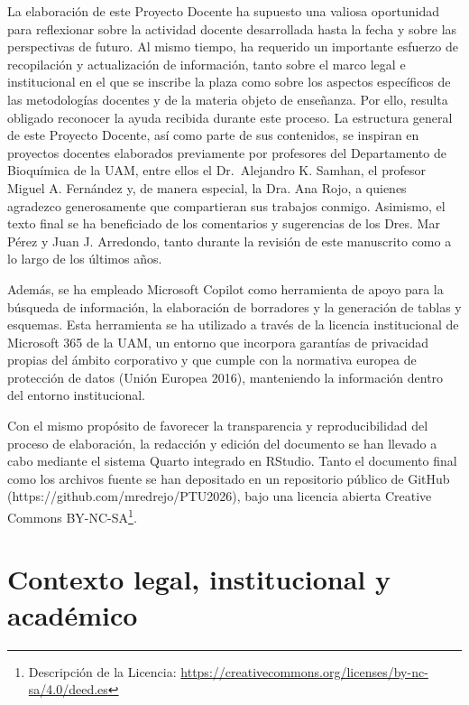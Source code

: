 \documentclass[
  11pt,
  a4paper,
  twoside]{scrreprt}
\begin{document}
La elaboración de este Proyecto Docente ha supuesto una valiosa
oportunidad para reflexionar sobre la actividad docente desarrollada
hasta la fecha y sobre las perspectivas de futuro. Al mismo tiempo, ha
requerido un importante esfuerzo de recopilación y actualización de
información, tanto sobre el marco legal e institucional en el que se
inscribe la plaza como sobre los aspectos específicos de las
metodologías docentes y de la materia objeto de enseñanza. Por ello,
resulta obligado reconocer la ayuda recibida durante este proceso. La
estructura general de este Proyecto Docente, así como parte de sus
contenidos, se inspiran en proyectos docentes elaborados previamente por
profesores del Departamento de Bioquímica de la UAM, entre ellos el
Dr.~Alejandro K. Samhan, el profesor Miguel A. Fernández y, de manera
especial, la Dra. Ana Rojo, a quienes agradezco generosamente que
compartieran sus trabajos conmigo. Asimismo, el texto final se ha
beneficiado de los comentarios y sugerencias de los Dres. Mar Pérez y
Juan J. Arredondo, tanto durante la revisión de este manuscrito como a
lo largo de los últimos años.

Además, se ha empleado Microsoft Copilot como herramienta de apoyo para
la búsqueda de información, la elaboración de borradores y la generación
de tablas y esquemas. Esta herramienta se ha utilizado a través de la
licencia institucional de Microsoft 365 de la UAM, un entorno que
incorpora garantías de privacidad propias del ámbito corporativo y que
cumple con la normativa europea de protección de datos (Unión Europea
2016), manteniendo la información dentro del entorno institucional.

Con el mismo propósito de favorecer la transparencia y reproducibilidad
del proceso de elaboración, la redacción y edición del documento se han
llevado a cabo mediante el sistema Quarto integrado en RStudio. Tanto el
documento final como los archivos fuente se han depositado en un
repositorio público de GitHub (https://github.com/mredrejo/PTU2026),
bajo una licencia abierta Creative Commons BY-NC-SA\footnote{Descripción
  de la Licencia:
  \url{https://creativecommons.org/licenses/by-nc-sa/4.0/deed.es}}.


\chapter{Contexto legal, institucional y académico}\label{sec-context}
\end{document}
